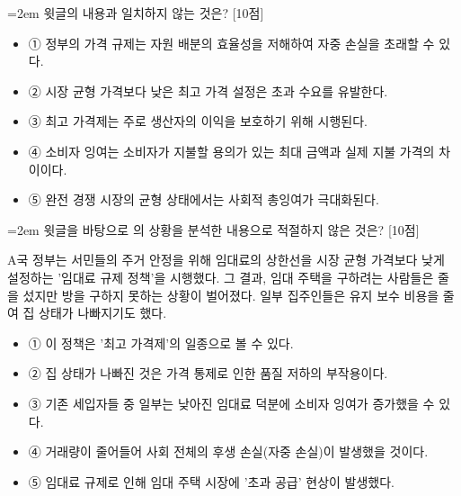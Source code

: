 \documentclass[10pt,a4paper]{article}
\newcommand{\qnum}[1]{%
  \tikz[baseline=(num.base)]{%
    \node[circle, fill=numCircle, text=white, inner sep=0pt,
          minimum size=18pt, font=\small\bfseries] (num) {#1};%
  }%
}
\newcommand{\pts}[1]{%
  \hfill\textcolor{ptsBadge}{[#1점]}%
}
\begin{document}
\begin{minipage}{\columnwidth}
{\hangindent=2em
\qnum{9}\enspace 윗글의 내용과 일치하지 않는 것은? \pts{10}
\par}

\vspace{3mm}
\begin{itemize}[leftmargin=2.5em, labelsep=0.3em, label={}, itemsep=4pt, parsep=1pt, topsep=0pt]
  \item ① 정부의 가격 규제는 자원 배분의 효율성을 저해하여 자중 손실을 초래할 수 있다.
  \item ② 시장 균형 가격보다 낮은 최고 가격 설정은 초과 수요를 유발한다.
  \item ③ 최고 가격제는 주로 생산자의 이익을 보호하기 위해 시행된다.
  \item ④ 소비자 잉여는 소비자가 지불할 용의가 있는 최대 금액과 실제 지불 가격의 차이이다.
  \item ⑤ 완전 경쟁 시장의 균형 상태에서는 사회적 총잉여가 극대화된다.
\end{itemize}
\end{minipage}
\vspace{4mm}

\vspace{4mm}
\begin{minipage}{\columnwidth}
{\hangindent=2em
\qnum{10}\enspace 윗글을 바탕으로 의 상황을 분석한 내용으로 적절하지 않은 것은? \pts{10}
\par}

\vspace{3mm}
\begin{tcolorbox}[bogi]
A국 정부는 서민들의 주거 안정을 위해 임대료의 상한선을 시장 균형 가격보다 낮게 설정하는 '임대료 규제 정책'을 시행했다. 그 결과, 임대 주택을 구하려는 사람들은 줄을 섰지만 방을 구하지 못하는 상황이 벌어졌다. 일부 집주인들은 유지 보수 비용을 줄여 집 상태가 나빠지기도 했다.
\end{tcolorbox}
\vspace{3mm}
\begin{itemize}[leftmargin=2.5em, labelsep=0.3em, label={}, itemsep=4pt, parsep=1pt, topsep=0pt]
  \item ① 이 정책은 '최고 가격제'의 일종으로 볼 수 있다.
  \item ② 집 상태가 나빠진 것은 가격 통제로 인한 품질 저하의 부작용이다.
  \item ③ 기존 세입자들 중 일부는 낮아진 임대료 덕분에 소비자 잉여가 증가했을 수 있다.
  \item ④ 거래량이 줄어들어 사회 전체의 후생 손실(자중 손실)이 발생했을 것이다.
  \item ⑤ 임대료 규제로 인해 임대 주택 시장에 '초과 공급' 현상이 발생했다.
\end{itemize}
\end{minipage}
\vspace{4mm}
\end{document}
